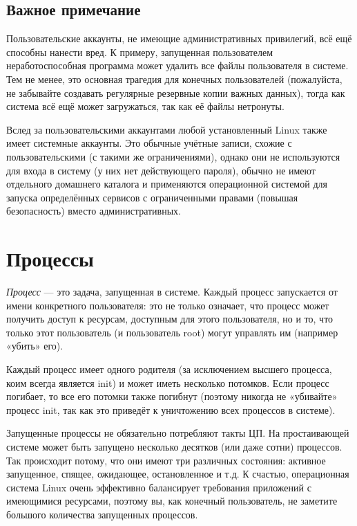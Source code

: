 \documentclass[12pt]{book}
\begin{document}
\subsection{Важное примечание}

Пользовательские аккаунты, не имеющие административных привилегий, всё ещё способны нанести вред. К примеру, запущенная пользователем неработоспособная программа может удалить все файлы пользователя в системе. Тем не менее, это основная трагедия для конечных пользователей (пожалуйста, не забывайте создавать регулярные резервные копии важных данных), тогда как система всё ещё может загружаться, так как её файлы нетронуты. 

Вслед за пользовательскими аккаунтами любой установленный Linux также имеет системные аккаунты. Это обычные учётные записи, схожие с пользовательскими (с такими же ограничениями), однако они не используются для входа в систему (у них нет действующего пароля), обычно не имеют отдельного домашнего каталога и применяются операционной системой для запуска определённых сервисов с ограниченными правами (повышая безопасность) вместо административных. 

\section{Процессы}

\emph{Процесс} — это задача, запущенная в системе. Каждый процесс запускается от имени конкретного пользователя: это не только означает, что процесс может получить доступ к ресурсам, доступным для этого пользователя, но и то, что только этот пользователь (и пользователь root) могут управлять им (например «убить» его).

Каждый процесс имеет одного родителя (за исключением высшего процесса, коим всегда является init) и может иметь несколько потомков. Если процесс погибает, то все его потомки также погибнут (поэтому никогда не «убивайте» процесс init, так как это приведёт  к уничтожению всех процессов в системе).

Запущенные процессы не обязательно потребляют такты ЦП. На простаивающей системе может быть запущено несколько десятков (или даже сотни) процессов. Так происходит потому, что они имеют три различных состояния: активное запущенное, спящее, ожидающее, остановленное и т.д. К счастью, операционная система Linux очень эффективно балансирует требования приложений с имеющимися ресурсами, поэтому вы, как конечный пользователь, не заметите большого количества запущенных процессов. 
\end{document}

